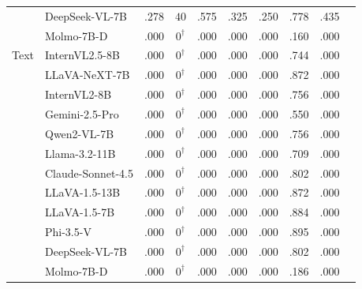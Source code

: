 \begin{tabular}{@{}llcccccccc@{}}
 & DeepSeek-VL-7B & .278 & $40$ & .575 & .325 & .250 & .778 & .435 \\
 & Molmo-7B-D & .000 & $0^\dagger$ & .000 & .000 & .000 & .160 & .000 \\
\midrule
Text & InternVL2.5-8B & .000 & $0^\dagger$ & .000 & .000 & .000 & .744 & .000 \\
 & LLaVA-NeXT-7B & .000 & $0^\dagger$ & .000 & .000 & .000 & .872 & .000 \\
 & InternVL2-8B & .000 & $0^\dagger$ & .000 & .000 & .000 & .756 & .000 \\
 & Gemini-2.5-Pro & .000 & $0^\dagger$ & .000 & .000 & .000 & .550 & .000 \\
 & Qwen2-VL-7B & .000 & $0^\dagger$ & .000 & .000 & .000 & .756 & .000 \\
 & Llama-3.2-11B & .000 & $0^\dagger$ & .000 & .000 & .000 & .709 & .000 \\
 & Claude-Sonnet-4.5 & .000 & $0^\dagger$ & .000 & .000 & .000 & .802 & .000 \\
 & LLaVA-1.5-13B & .000 & $0^\dagger$ & .000 & .000 & .000 & .872 & .000 \\
 & LLaVA-1.5-7B & .000 & $0^\dagger$ & .000 & .000 & .000 & .884 & .000 \\
 & Phi-3.5-V & .000 & $0^\dagger$ & .000 & .000 & .000 & .895 & .000 \\
 & DeepSeek-VL-7B & .000 & $0^\dagger$ & .000 & .000 & .000 & .802 & .000 \\
 & Molmo-7B-D & .000 & $0^\dagger$ & .000 & .000 & .000 & .186 & .000 \\
\bottomrule
\end{tabular}